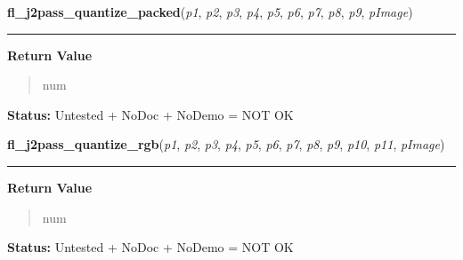     \label{xformslib:library:fl_j2pass_quantize_packed}

    \vspace{0.5ex}

\hspace{.8\funcindent}\begin{boxedminipage}{\funcwidth}

    \raggedright \textbf{fl\_j2pass\_quantize\_packed}(\textit{p1}, \textit{p2}, \textit{p3}, \textit{p4}, \textit{p5}, \textit{p6}, \textit{p7}, \textit{p8}, \textit{p9}, \textit{pImage})

    \vspace{-1.5ex}

    \rule{\textwidth}{0.5\fboxrule}
\setlength{\parskip}{2ex}
\setlength{\parskip}{1ex}
      \textbf{Return Value}
    \vspace{-1ex}

      \begin{quote}
      num

      \end{quote}

\textbf{Status:} Untested + NoDoc + NoDemo = NOT OK



    \end{boxedminipage}

    \label{xformslib:library:fl_j2pass_quantize_rgb}

    \vspace{0.5ex}

\hspace{.8\funcindent}\begin{boxedminipage}{\funcwidth}

    \raggedright \textbf{fl\_j2pass\_quantize\_rgb}(\textit{p1}, \textit{p2}, \textit{p3}, \textit{p4}, \textit{p5}, \textit{p6}, \textit{p7}, \textit{p8}, \textit{p9}, \textit{p10}, \textit{p11}, \textit{pImage})

    \vspace{-1.5ex}

    \rule{\textwidth}{0.5\fboxrule}
\setlength{\parskip}{2ex}
\setlength{\parskip}{1ex}
      \textbf{Return Value}
    \vspace{-1ex}

      \begin{quote}
      num

      \end{quote}

\textbf{Status:} Untested + NoDoc + NoDemo = NOT OK



    \end{boxedminipage}

